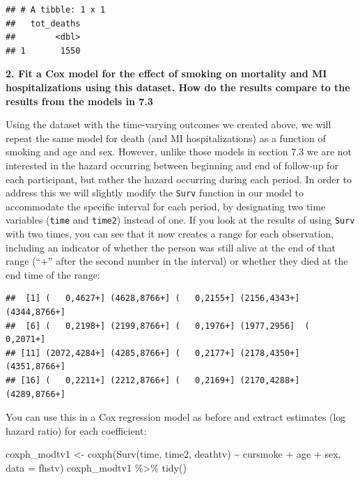 \documentclass[
]{book}
\newenvironment{Shaded}{\begin{snugshade}}{\end{snugshade}}
\newcommand{\AttributeTok}[1]{\textcolor[rgb]{0.77,0.63,0.00}{#1}}
\newcommand{\DecValTok}[1]{\textcolor[rgb]{0.00,0.00,0.81}{#1}}
\newcommand{\FunctionTok}[1]{\textcolor[rgb]{0.00,0.00,0.00}{#1}}
\newcommand{\NormalTok}[1]{#1}
\newcommand{\OtherTok}[1]{\textcolor[rgb]{0.56,0.35,0.01}{#1}}
\newcommand{\SpecialCharTok}[1]{\textcolor[rgb]{0.00,0.00,0.00}{#1}}
\begin{document}
\begin{verbatim}
## # A tibble: 1 x 1
##   tot_deaths
##        <dbl>
## 1       1550
\end{verbatim}

\textbf{2. Fit a Cox model for the effect of smoking on mortality and MI hospitalizations using this dataset. How do the results compare to the results from the models in 7.3}

Using the dataset with the time-varying outcomes we created above, we will repeat the same model for death (and MI hospitalizations) as a function of smoking and age and sex. However, unlike those models in section 7.3 we are not interested in the hazard occurring between beginning and end of follow-up for each participant, but rather the hazard occurring during each period. In order to address this we will slightly modify the \texttt{Surv} function in our model to accommodate the specific interval for each period, by designating two time variables (\texttt{time} and \texttt{time2}) instead of one. If you look at the results of using \texttt{Surv} with two times, you can see that it now creates a range for each observation, including an indicator of whether the person was still alive at the end of that range (``+'' after the second number in the interval) or whether they died at the end time of the range:

\begin{Shaded}
\end{Shaded}

\begin{verbatim}
##  [1] (   0,4627+] (4628,8766+] (   0,2155+] (2156,4343+] (4344,8766+]
##  [6] (   0,2198+] (2199,8766+] (   0,1976+] (1977,2956]  (   0,2071+]
## [11] (2072,4284+] (4285,8766+] (   0,2177+] (2178,4350+] (4351,8766+]
## [16] (   0,2211+] (2212,8766+] (   0,2169+] (2170,4288+] (4289,8766+]
\end{verbatim}

You can use this in a Cox regression model as before and extract estimates (log hazard ratio) for each coefficient:

\begin{Shaded}
\begin{Highlighting}[]
\NormalTok{coxph\_modtv1 }\OtherTok{\textless{}{-}} \FunctionTok{coxph}\NormalTok{(}\FunctionTok{Surv}\NormalTok{(time, time2, deathtv) }\SpecialCharTok{\textasciitilde{}}\NormalTok{ cursmoke }\SpecialCharTok{+}\NormalTok{ age }\SpecialCharTok{+}\NormalTok{ sex, }
                      \AttributeTok{data =}\NormalTok{ fhstv)}
\NormalTok{coxph\_modtv1 }\SpecialCharTok{\%\textgreater{}\%}
  \FunctionTok{tidy}\NormalTok{()}
\end{Highlighting}
\end{Shaded}
\end{document}
